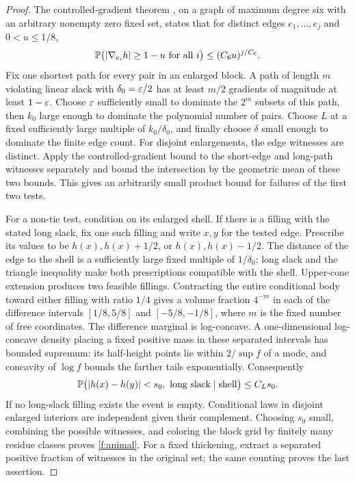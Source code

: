 \begin{proof}
The controlled-gradient theorem \cite[Theorem 1.1]{CAP}, on a graph of
maximum degree six with an arbitrary nonempty zero fixed set, states that
for distinct edges $e_1,\ldots,e_j$ and $0<u\le1/8$,
\[
 \mathbb P\bigl(|\nabla_{e_i}h|\ge1-u\text{ for all }i\bigr)
 \le(C_6u)^{j/C_6}.
\]
Fix one shortest path for every pair in an enlarged block. A path of
length $m$ violating linear slack with $\delta_0=\varepsilon/2$ has at least
$m/2$ gradients of magnitude at least $1-\varepsilon$. Choose $\varepsilon$ sufficiently
small to dominate the $2^m$ subsets of this path, then $k_0$ large enough
to dominate the polynomial number of pairs. Choose $L$ at a fixed
sufficiently large multiple of $k_0/\delta_0$, and finally choose $\delta$
small enough to dominate the finite edge count. For disjoint enlargements,
the edge witnesses are distinct. Apply the controlled-gradient bound to
the short-edge and long-path witnesses separately and bound the intersection
by the geometric mean of these two bounds. This gives an arbitrarily small
product bound for failures of the first two tests.

For a non-tie test, condition on its enlarged shell. If there is a filling
with the stated long slack, fix one such filling and write $x,y$ for the
tested edge. Prescribe its values to be $h(x),h(x)+1/2$, or
$h(x),h(x)-1/2$. The distance of the edge to the shell is a sufficiently
large fixed multiple of $1/\delta_0$; long slack and the triangle inequality
make both prescriptions compatible with the shell. Upper-cone extension
produces two feasible fillings. Contracting the entire conditional body
toward either filling with ratio $1/4$ gives a volume fraction $4^{-m}$
in each of the difference intervals $[1/8,5/8]$ and $[-5/8,-1/8]$,
where $m$ is the fixed number of free coordinates. The difference marginal
is log-concave. A one-dimensional log-concave density placing a fixed
positive mass in these separated intervals has bounded supremum: its
half-height points lie within $2/\sup f$ of a mode, and concavity of
$\log f$ bounds the farther tails exponentially. Consequently
\[
 \mathbb P\bigl(|h(x)-h(y)|<s_0,\ \text{long slack}\mid\text{shell}\bigr)
 \le C_Ls_0.
\]
If no long-slack filling exists the event is empty. Conditional laws in
disjoint enlarged interiors are independent given their complement.
Choosing $s_0$ small, combining the possible witnesses, and coloring the
block grid by finitely many residue classes proves \eqref{f:animal}.
For a fixed thickening, extract a separated positive fraction of witnesses
in the original set; the same counting proves the last assertion.
\end{proof}

